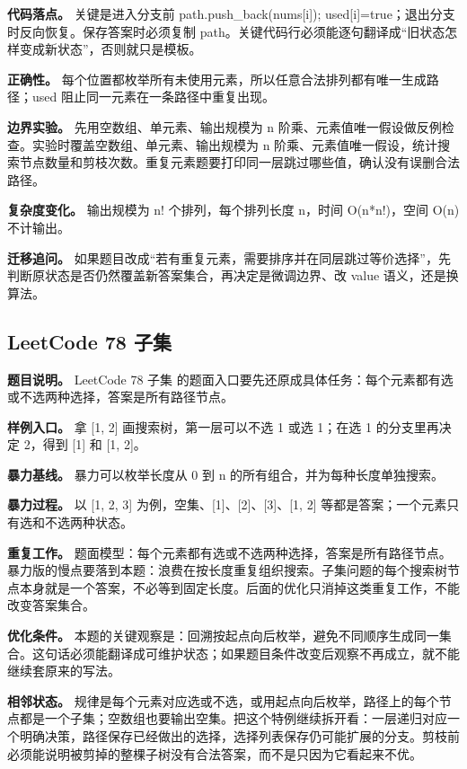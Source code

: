 \textbf{代码落点。} 关键是进入分支前 path.push\_back(nums[i]); used[i]=true；退出分支时反向恢复。保存答案时必须复制 path。关键代码行必须能逐句翻译成“旧状态怎样变成新状态”，否则就只是模板。

\textbf{正确性。} 每个位置都枚举所有未使用元素，所以任意合法排列都有唯一生成路径；used 阻止同一元素在一条路径中重复出现。

\textbf{边界实验。} 先用空数组、单元素、输出规模为 n 阶乘、元素值唯一假设做反例检查。实验时覆盖空数组、单元素、输出规模为 n 阶乘、元素值唯一假设，统计搜索节点数量和剪枝次数。重复元素题要打印同一层跳过哪些值，确认没有误删合法路径。

\textbf{复杂度变化。} 输出规模为 n! 个排列，每个排列长度 n，时间 O(n*n!)，空间 O(n) 不计输出。

\textbf{迁移追问。} 如果题目改成“若有重复元素，需要排序并在同层跳过等价选择”，先判断原状态是否仍然覆盖新答案集合，再决定是微调边界、改 value 语义，还是换算法。

\subsection{LeetCode 78 子集}

\textbf{题目说明。} LeetCode 78 子集 的题面入口要先还原成具体任务：每个元素都有选或不选两种选择，答案是所有路径节点。

\textbf{样例入口。} 拿 [1, 2] 画搜索树，第一层可以不选 1 或选 1；在选 1 的分支里再决定 2，得到 [1] 和 [1, 2]。

\textbf{暴力基线。} 暴力可以枚举长度从 0 到 n 的所有组合，并为每种长度单独搜索。

\textbf{暴力过程。} 以 [1, 2, 3] 为例，空集、[1]、[2]、[3]、[1, 2] 等都是答案；一个元素只有选和不选两种状态。

\textbf{重复工作。} 题面模型：每个元素都有选或不选两种选择，答案是所有路径节点。暴力版的慢点要落到本题：浪费在按长度重复组织搜索。子集问题的每个搜索树节点本身就是一个答案，不必等到固定长度。后面的优化只消掉这类重复工作，不能改变答案集合。

\textbf{优化条件。} 本题的关键观察是：回溯按起点向后枚举，避免不同顺序生成同一集合。这句话必须能翻译成可维护状态；如果题目条件改变后观察不再成立，就不能继续套原来的写法。

\textbf{相邻状态。} 规律是每个元素对应选或不选，或用起点向后枚举，路径上的每个节点都是一个子集；空数组也要输出空集。把这个特例继续拆开看：一层递归对应一个明确决策，路径保存已经做出的选择，选择列表保存仍可能扩展的分支。剪枝前必须能说明被剪掉的整棵子树没有合法答案，而不是只因为它看起来不优。

